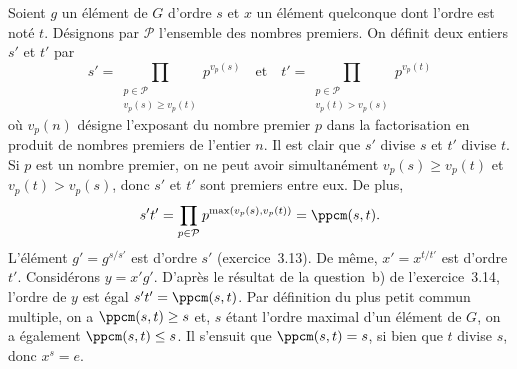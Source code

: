 Soient $g$ un élément de $G$ d'ordre $s$ et $x$ un élément quelconque dont l'ordre est noté $t$.
Désignons par $\mathcal{P}$ l'ensemble des nombres premiers.
On définit deux entiers $s'$ et $t'$ par
\[
  s' = \prod_{\substack{p\in\mathcal{P}\\ v_p(s) \geq v_p(t)}} p^{v_p(s)}
  \quad\text{et}\quad
  t' = \prod_{\substack{p\in\mathcal{P}\\ v_p(t) > v_p(s)}} p^{v_p(t)}
\]
où $v_p(n)$ désigne l'exposant du nombre premier $p$ dans la factorisation en produit de nombres premiers de l'entier $n$.
Il est clair que $s'$ divise $s$ et $t'$ divise $t$.
Si $p$ est un nombre premier, on ne peut avoir simultanément $v_p(s)\geq v_p(t)$ et $v_p(t) > v_p(s)$, donc $s'$ et $t'$ sont premiers entre eux.
De plus,
\[
  s't' = \prod_{p\in\mathcal{P}} p^{\max(v_p(s), v_p(t))} = \ppcm(s, t).
\]
L'élément $g' = g^{s/s'}$ est d'ordre $s'$ (exercice~3.13).
De même, $x' = x^{t/t'}$ est d'ordre $t'$.
Considérons $y = x'g'$.
D'après le résultat de la question~b) de l'exercice~3.14, l'ordre de $y$ est égal $s't' = \ppcm(s, t)$.
Par définition du plus petit commun multiple, on a $\ppcm(s, t) \geq s$ et, $s$ étant l'ordre maximal d'un élément de $G$, on a également $\ppcm(s, t) \leq s$.
Il s'ensuit que $\ppcm(s, t) = s$, si bien que $t$ divise $s$, donc $x^s = e$.
